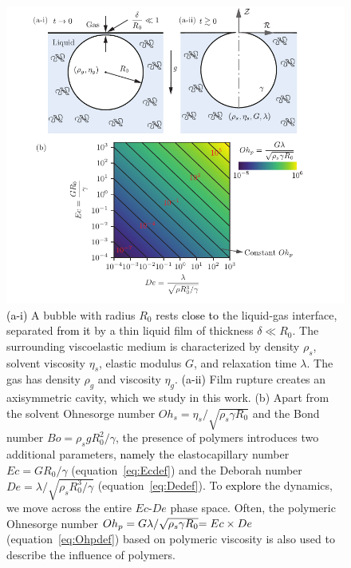 \documentclass{jfm}
\newcommand{\DL}[1]{{\textcolor{black}{#1}}}
\newcommand{\AKD}[1]{{\textcolor{black}{#1}}}
\begin{document}
\begin{figure}
	\centering
	\includegraphics[width=\textwidth]{Figures/Schematic/Bubblebursting_polymers_schematic_v5-eps-converted-to.pdf}
	\caption { \AKD{(a-i)} A bubble with radius $R_0$ rests \DL{close to} the liquid-gas interface, separated \DL{from it} by a thin liquid film of thickness $\delta \ll R_0$. The surrounding viscoelastic medium is characterized by density $\rho_s$, solvent viscosity $\eta_s$, elastic modulus $G$, and relaxation time $\lambda$. The gas has density $\rho_g$ and viscosity $\eta_g$. \AKD{(a-ii)} Film rupture creates an axisymmetric cavity, which we study in this work. (b) Apart from the solvent Ohnesorge number $Oh_s = \eta_s/\sqrt{\rho_s\gamma R_0}$ and the Bond number $Bo = \rho_sgR_0^2/\gamma$, the presence of polymers introduces two additional parameters, \DL{namely} the elastocapillary number $Ec = GR_0/\gamma$ (equation~\eqref{eq:Ecdef}) and the Deborah number $De = \lambda/\sqrt{\rho_s R_0^3/\gamma}$ (equation~\eqref{eq:Dedef}). To \DL{explore} the dynamics, we move across the entire $Ec$-$De$ phase space. Often, the polymeric Ohnesorge number $Oh_p = G\lambda/\sqrt{\rho_s\gamma R_0} \DL{ = Ec \times De}$ (equation~\eqref{eq:Ohpdef})  based on polymeric viscosity is also used to describe the influence of polymers.}
	\label{schematic}
\end{figure}
\end{document}
